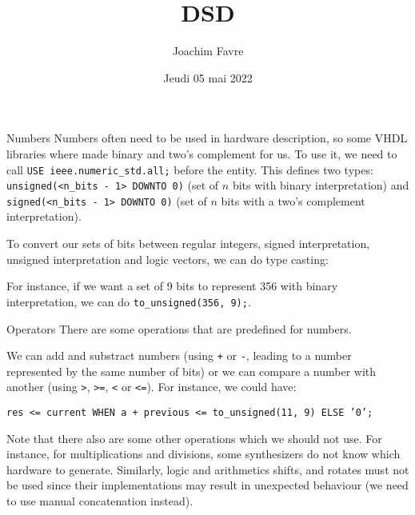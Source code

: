 \documentclass[a4paper]{article}
\title{DSD}
\author{Joachim Favre}
\date{Jeudi 05 mai 2022}
\begin{document}
\maketitle


\begin{parag}{Numbers}
    Numbers often need to be used in hardware description, so some VHDL libraries where made binary and two's complement for us. To use it, we need to call \texttt{USE ieee.numeric\_std.all;} before the entity. This defines two types: \texttt{unsigned(<n\_bits - 1> DOWNTO 0)} (set of $n$ bits with binary interpretation) and \texttt{signed(<n\_bits - 1> DOWNTO 0)} (set of $n$ bits with a two's complement interpretation).

    To convert our sets of bits between regular integers, signed interpretation, unsigned interpretation and logic vectors, we can do type casting:

    For instance, if we want a set of 9 bits to represent 356 with binary interpretation, we can do \texttt{to\_unsigned(356, 9);}.
\end{parag}

\begin{parag}{Operators}
    There are some operations that are predefined for numbers. 

    We can add and substract numbers (using \texttt{+} or \texttt{-}, leading to a number represented by the same number of bits) or we can compare a number with another (using \texttt{>}, \texttt{>=}, \texttt{<} or \texttt{<=}). For instance, we could have:
    \begin{center}
        \texttt{res <= current WHEN a + previous <= to\_unsigned(11, 9) ELSE '0';}
    \end{center}
    
    Note that there also are some other operations which we should not use. For instance, for multiplications and divisions, some synthesizers do not know which hardware to generate. Similarly, logic and arithmetics shifts, and rotates must not be used since their implementations may result in unexpected behaviour (we need to use manual concatenation instead).
\end{parag}
\end{document}
